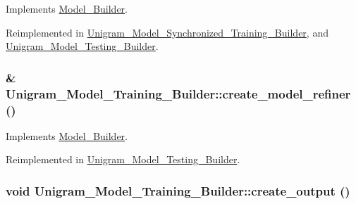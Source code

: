 Implements \hyperlink{class_model___builder_a52e9a4125b917b015f13c709ddef3a88}{Model\_\-Builder}.



Reimplemented in \hyperlink{class_unigram___model___synchronized___training___builder_a756ac51fbf24f5c0381dfe402ee53ef0}{Unigram\_\-Model\_\-Synchronized\_\-Training\_\-Builder}, and \hyperlink{class_unigram___model___testing___builder_a934d4e14760ff82eeae8165f9c628a95}{Unigram\_\-Model\_\-Testing\_\-Builder}.

\hypertarget{class_unigram___model___training___builder_a6693c87834917804525d1d8f4d638507}{
\subsubsection[{create\_\-model\_\-refiner}]{ \& Unigram\_\-Model\_\-Training\_\-Builder::create\_\-model\_\-refiner ()}}
\label{class_unigram___model___training___builder_a6693c87834917804525d1d8f4d638507}


Implements \hyperlink{class_model___builder_abc7e4f108067afb34fb8c0fc305b06ea}{Model\_\-Builder}.



Reimplemented in \hyperlink{class_unigram___model___testing___builder_a694c9cb5f270cad6ff5e9d0b45da9ba6}{Unigram\_\-Model\_\-Testing\_\-Builder}.

\hypertarget{class_unigram___model___training___builder_a5377e0fdb76e0068a02cbc0ce5c385fb}{
\subsubsection[{create\_\-output}]{\setlength{\rightskip}{0pt plus 5cm}void Unigram\_\-Model\_\-Training\_\-Builder::create\_\-output ()}}
\label{class_unigram___model___training___builder_a5377e0fdb76e0068a02cbc0ce5c385fb}


